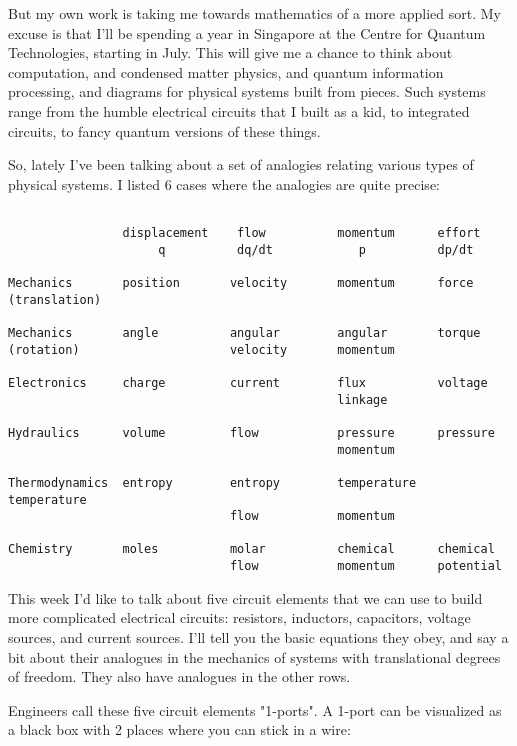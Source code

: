 But my own work is taking me towards mathematics of a more
applied sort.  My excuse is that I'll be spending a year in Singapore
at the Centre for Quantum Technologies, starting in July.  This will
give me a chance to think about computation, and condensed matter
physics, and quantum information processing, and diagrams for physical
systems built from pieces.  Such systems range from the humble
electrical circuits that I built as a kid, to integrated circuits, to
fancy quantum versions of these things.

So, lately I've been talking about a set of analogies relating various
types of physical systems.  I listed 6 cases where the analogies
are quite precise:

\begin{verbatim}

                displacement    flow          momentum      effort
                     q          dq/dt            p          dp/dt

Mechanics       position       velocity       momentum      force
(translation)

Mechanics       angle          angular        angular       torque
(rotation)                     velocity       momentum

Electronics     charge         current        flux          voltage
                                              linkage

Hydraulics      volume         flow           pressure      pressure
                                              momentum

Thermodynamics  entropy        entropy        temperature   temperature
                               flow           momentum

Chemistry       moles          molar          chemical      chemical
                               flow           momentum      potential

\end{verbatim}
    
This week I'd like to talk about five circuit elements that we can use
to build more complicated electrical circuits: resistors, inductors,
capacitors, voltage sources, and current sources.  I'll tell you the
basic equations they obey, and say a bit about their analogues in the
mechanics of systems with translational degrees of freedom.  They also
have analogues in the other rows.

Engineers call these five circuit elements "1-ports".  A
1-port can be visualized as a black box with 2 places where you can
stick in a wire:

